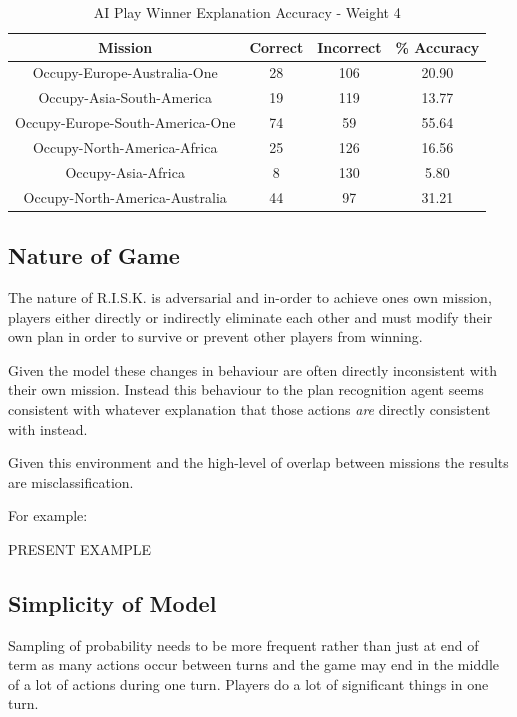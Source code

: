 \documentclass[parskip]{cs4rep}
\begin{document}
\begin{table}[ht]
\centering
\begin{tabular}{|c|c|c|c|}
\hline 
\textbf{Mission} & \textbf{Correct} & \textbf{Incorrect} & \textbf{\% Accuracy} \\ 
\hline 
Occupy-Europe-Australia-One & 28 & 106 & 20.90 \\  
\hline 
Occupy-Asia-South-America & 19 & 119 & 13.77 \\ 
\hline
Occupy-Europe-South-America-One & 74 & 59 & 55.64 \\
\hline
Occupy-North-America-Africa & 25 & 126 & 16.56 \\
\hline
Occupy-Asia-Africa & 8 & 130 & 5.80 \\
\hline
Occupy-North-America-Australia & 44 & 97 & 31.21 \\
\hline
\end{tabular}
\caption{AI Play Winner Explanation Accuracy - Weight 4}
\label{table:ai-4-loser-accuracy}
\end{table}

\subsection{Nature of Game}

The nature of R.I.S.K. is adversarial and in-order to achieve ones own mission, players either directly or indirectly eliminate each other and must modify their own plan in order to survive or prevent other players from winning. 

Given the model these changes in behaviour are often directly inconsistent with their own mission. Instead this behaviour to the plan recognition agent seems consistent with whatever explanation that those actions \textit{are} directly consistent with instead.

Given this environment and the high-level of overlap between missions the results are misclassification.

For example:

PRESENT EXAMPLE

\subsection{Simplicity of Model}

Sampling of probability needs to be more frequent rather than just at end of term as many actions occur between turns and the game may end in the middle of a lot of actions during one turn. Players do a lot of significant things in one turn.
\end{document}
